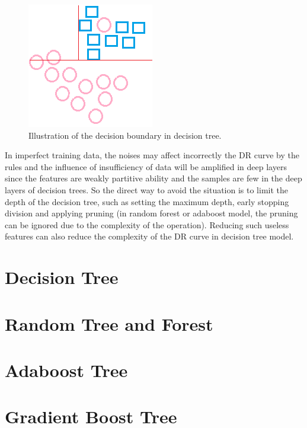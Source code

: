 \documentclass[runningheads,openany]{xhlPaper}
\begin{document}
\begin{figure}
\centering
\includegraphics[width=0.5\linewidth]{overFittingDiscriminantCurveInDecisionTree}
\caption{Illustration of the decision boundary in decision tree.}
\label{fig:overFittingDiscriminantCurveInDecisionTree}
\end{figure}

In imperfect training data, the noises may affect incorrectly the DR curve by the rules and the influence of insufficiency of data will be amplified in deep layers since the features are weakly partitive ability and the samples are few in the deep layers of decision trees. So the direct way to avoid the situation is to limit the depth of the decision tree, such as setting the maximum depth, early stopping division and applying pruning (in random forest or adaboost model, the pruning can be ignored due to the complexity of the operation). Reducing such useless features can also reduce the complexity of the DR curve in decision tree model.

\section{Decision Tree}

\section{Random Tree and Forest}

\section{Adaboost Tree}

\section{Gradient Boost Tree}
\end{document}
